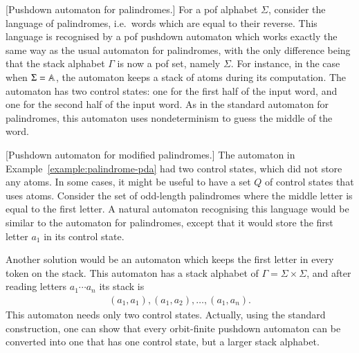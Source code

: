 \begin{myexample}\label{example:palindrome-pda}[Pushdown automaton for palindromes.]
	For a pof alphabet $\Sigma$, consider the language of palindromes, i.e.~words which are equal to their reverse.
	This language is recognised by a pof pushdown automaton which works exactly the same way as the usual automaton for palindromes, with the only difference being that the stack alphabet $\Gamma$ is now a pof  set, namely  $\Sigma$. For instance, in the case when $\Sigma = \mathbb A$, the automaton keeps a stack of atoms during its computation. The automaton has two control states: one for the first half of the input word, and one for the second half of the input  word. As in the standard automaton for palindromes, this automaton uses nondeterminism to guess the middle of the word.
	\end{myexample}
	
	
	\begin{myexample}\label{example:mid-palindrome-pda}[Pushdown automaton for modified palindromes.]
		The automaton in Example~\ref{example:palindrome-pda} had two control states, which did not store any atoms. In some cases, it might be useful to have a set $Q$ of control states that uses atoms. Consider  the set of odd-length palindromes where the middle letter is equal to the first letter. 
		A natural automaton  recognising this language would be similar to the automaton for palindromes, except that it would store the first letter $a_1$ in its control state. 
		
		Another solution would be an automaton which keeps the first letter in every token on the stack. This automaton has a stack alphabet of $\Gamma = \Sigma \times \Sigma$, and after reading letters $a_1 \cdots a_n$ its stack is
		\begin{align*}
			(a_1,a_1),(a_1,a_2),\ldots,(a_1,a_n).
		\end{align*}
		This automaton needs only two control states. Actually, using the standard construction, one can show that every orbit-finite pushdown automaton  can be converted into one that has one control state, but a larger stack alphabet.
	\end{myexample}
	
